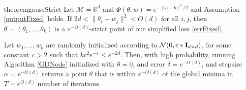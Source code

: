 \documentclass{article}
\newcommand{\R}{{\mathbb{R}}}
\begin{document}
\begin{restatable}{theorem}{gaussStrict}
\label{GaussStrict}
Let $\mathcal{M} = \R^d$ and $\Phi(\theta,w) = e^{-\|a-b\|^2/2}$ and Assumption \ref{outputFixed} holds. If $2d < \|\theta_i - w_j\|^2 < O(d)$ for all $i, j$, then $\theta = (\theta_1,...,\theta_k)$ is a $e^{-O(d)}$-strict point of our simplified loss \eqref{errFixed}.

Let $w_1,...,w_k$ are randomly initialized according to $\mathcal{N}(0, c*{\bf I}_{d\times d})$, for some constant $c > 2$ such that $kc^2e^{-c} \leq e^{-2d}$. Then, with high probability, running Algorithm \ref{GDNode} initialized with $\theta = 0$, and error  $\delta = e^{-O(d)}$, and stepsize $\alpha = e^{-O(d)}$ returns a point $\theta$ that is within $e^{-O(d)}$ of the global minima in $T = e^{O(d)}$ number of iterations.

\end{restatable}
\end{document}
